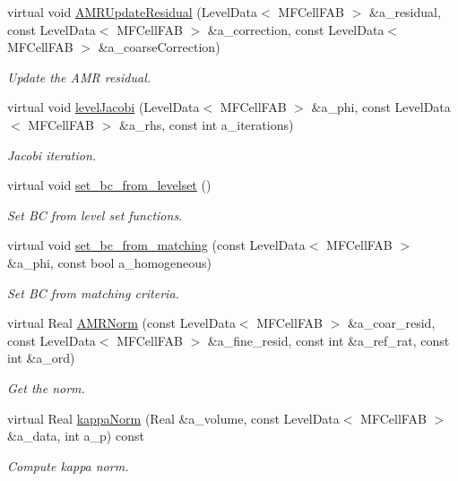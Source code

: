 \begin{DoxyCompactItemize}
virtual void \hyperlink{classnwomfconductivityop_a3df781ffc579d605266d3a34d679fe08}{A\+M\+R\+Update\+Residual} (Level\+Data$<$ M\+F\+Cell\+F\+AB $>$ \&a\+\_\+residual, const Level\+Data$<$ M\+F\+Cell\+F\+AB $>$ \&a\+\_\+correction, const Level\+Data$<$ M\+F\+Cell\+F\+AB $>$ \&a\+\_\+coarse\+Correction)
\begin{DoxyCompactList}\small\item\em Update the A\+MR residual. \end{DoxyCompactList}\item 
virtual void \hyperlink{classnwomfconductivityop_ae83dce7f621aad99f685edf59c976018}{level\+Jacobi} (Level\+Data$<$ M\+F\+Cell\+F\+AB $>$ \&a\+\_\+phi, const Level\+Data$<$ M\+F\+Cell\+F\+AB $>$ \&a\+\_\+rhs, const int a\+\_\+iterations)
\begin{DoxyCompactList}\small\item\em Jacobi iteration. \end{DoxyCompactList}\item 
virtual void \hyperlink{classnwomfconductivityop_a4d371141dfefc636d09e8283e3a8f27f}{set\+\_\+bc\+\_\+from\+\_\+levelset} ()
\begin{DoxyCompactList}\small\item\em Set BC from level set functions. \end{DoxyCompactList}\item 
virtual void \hyperlink{classnwomfconductivityop_aa8fd01faaa6573464258446d17b6c595}{set\+\_\+bc\+\_\+from\+\_\+matching} (const Level\+Data$<$ M\+F\+Cell\+F\+AB $>$ \&a\+\_\+phi, const bool a\+\_\+homogeneous)
\begin{DoxyCompactList}\small\item\em Set BC from matching criteria. \end{DoxyCompactList}\item 
virtual Real \hyperlink{classnwomfconductivityop_a30c1845582d5a91873e7ef5337b238a9}{A\+M\+R\+Norm} (const Level\+Data$<$ M\+F\+Cell\+F\+AB $>$ \&a\+\_\+coar\+\_\+resid, const Level\+Data$<$ M\+F\+Cell\+F\+AB $>$ \&a\+\_\+fine\+\_\+resid, const int \&a\+\_\+ref\+\_\+rat, const int \&a\+\_\+ord)
\begin{DoxyCompactList}\small\item\em Get the norm. \end{DoxyCompactList}\item 
virtual Real \hyperlink{classnwomfconductivityop_a4f06bdad22ae718c91d014d4337eb806}{kappa\+Norm} (Real \&a\+\_\+volume, const Level\+Data$<$ M\+F\+Cell\+F\+AB $>$ \&a\+\_\+data, int a\+\_\+p) const 
\begin{DoxyCompactList}\small\item\em Compute kappa norm. \end{DoxyCompactList}\end{DoxyCompactItemize}
